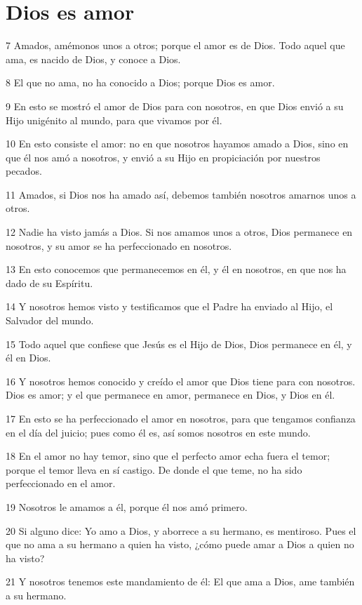 \section*{Dios es amor}

\par 7 Amados, amémonos unos a otros; porque el amor es de Dios. Todo aquel que ama, es nacido de Dios, y conoce a Dios.
\par 8 El que no ama, no ha conocido a Dios; porque Dios es amor.
\par 9 En esto se mostró el amor de Dios para con nosotros, en que Dios envió a su Hijo unigénito al mundo, para que vivamos por él.
\par 10 En esto consiste el amor: no en que nosotros hayamos amado a Dios, sino en que él nos amó a nosotros, y envió a su Hijo en propiciación por nuestros pecados.
\par 11 Amados, si Dios nos ha amado así, debemos también nosotros amarnos unos a otros.
\par 12 Nadie ha visto jamás a Dios. Si nos amamos unos a otros, Dios permanece en nosotros, y su amor se ha perfeccionado en nosotros.
\par 13 En esto conocemos que permanecemos en él, y él en nosotros, en que nos ha dado de su Espíritu.
\par 14 Y nosotros hemos visto y testificamos que el Padre ha enviado al Hijo, el Salvador del mundo.
\par 15 Todo aquel que confiese que Jesús es el Hijo de Dios, Dios permanece en él, y él en Dios.
\par 16 Y nosotros hemos conocido y creído el amor que Dios tiene para con nosotros. Dios es amor; y el que permanece en amor, permanece en Dios, y Dios en él.
\par 17 En esto se ha perfeccionado el amor en nosotros, para que tengamos confianza en el día del juicio; pues como él es, así somos nosotros en este mundo.
\par 18 En el amor no hay temor, sino que el perfecto amor echa fuera el temor; porque el temor lleva en sí castigo. De donde el que teme, no ha sido perfeccionado en el amor.
\par 19 Nosotros le amamos a él, porque él nos amó primero.
\par 20 Si alguno dice: Yo amo a Dios, y aborrece a su hermano, es mentiroso. Pues el que no ama a su hermano a quien ha visto, ¿cómo puede amar a Dios a quien no ha visto?
\par 21 Y nosotros tenemos este mandamiento de él: El que ama a Dios, ame también a su hermano.

